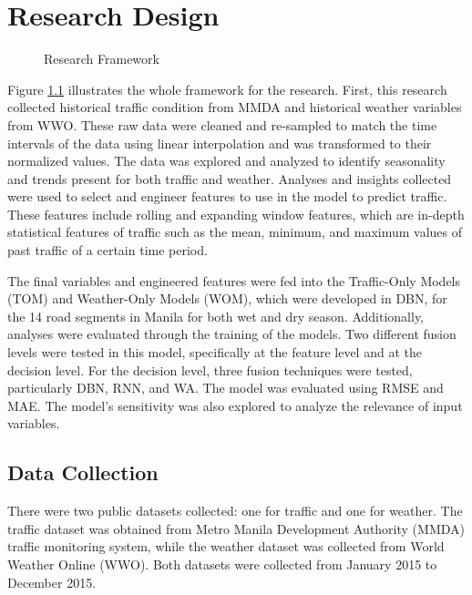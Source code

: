 \chapter{Research Design}
\label{resdes}

\begin{figure}[h]
	\centering
	\captionsetup{justification=centering}
	\caption{Research Framework}
	\label{fig:framework}
\end{figure}

Figure \ref{fig:framework} illustrates the whole framework for the research. First, this research collected historical traffic condition from MMDA and historical weather variables from WWO. These raw data were cleaned and re-sampled to match the time intervals of the data using linear interpolation and was transformed to their normalized values. The data was explored and analyzed to identify seasonality and trends present for both traffic and weather. Analyses and insights collected were used to select and engineer features to use in the model to predict traffic. These features include rolling and expanding window features, which are in-depth statistical features of traffic such as the mean, minimum, and maximum values of past traffic of a certain time period.

The final variables and engineered features were fed into the Traffic-Only Models (TOM) and Weather-Only Models (WOM), which were developed in DBN, for the 14 road segments in Manila for both wet and dry season. Additionally, analyses were evaluated through the training of the models. Two different fusion levels were tested in this model, specifically at the feature level and at the decision level. For the decision level, three fusion techniques were tested, particularly DBN, RNN, and WA. The model was evaluated using RMSE and MAE. The model’s sensitivity was also explored to analyze the relevance of input variables. 



\section{Data Collection}
\label{rd_datacollection}
There were two public datasets collected: one for traffic and one for weather. The traffic dataset was obtained from Metro Manila Development Authority (MMDA) traffic monitoring system, while the weather dataset was collected from World Weather Online (WWO). Both datasets were collected from January 2015 to December 2015.

